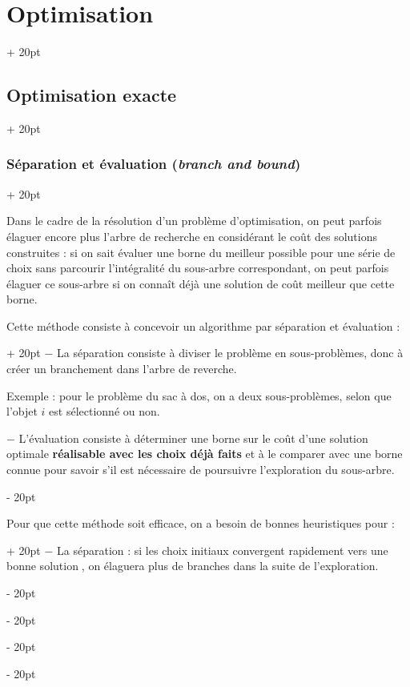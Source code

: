 \documentclass[a4paper, 12pt, twoside]{article}
\newcommand{\simplecit}[1]{\guillemotleft$\;$#1$\;$\guillemotright}
\newcommand{\ind}[1][20pt]{\advance\leftskip + #1}
\newcommand{\deind}[1][20pt]{\advance\leftskip - #1}
\newenvironment{indt}[2][20pt]{#2 \par \ind[#1]}{\par \deind} %
\newcommand{\1}{\mathbbm 1}
\begin{document}
\begin{indt}{\section{Optimisation}}
\begin{indt}{\subsection{Optimisation exacte}}
\begin{indt}{\subsubsection{Séparation et évaluation (\textit{branch and bound})}}
\begin{center}
                \end{center}

                Dans le cadre de la résolution d'un problème d'optimisation, on peut parfois élaguer encore plus l'arbre de recherche en considérant le coût des solutions construites : si on sait évaluer une borne du meilleur possible pour une série de choix sans parcourir l'intégralité du sous-arbre correspondant, on peut parfois élaguer ce sous-arbre si on connaît déjà une solution de coût meilleur que cette borne.

                \begin{indt}{Cette méthode consiste à concevoir un algorithme par séparation et évaluation :}
                    $-$ La séparation consiste à diviser le problème en sous-problèmes, donc à créer un branchement dans l'arbre de reverche.

                    Exemple : pour le problème du sac à dos, on a deux sous-problèmes, selon que l'objet $i$ est sélectionné ou non.

                    \vspace{6pt}
                    
                    $-$ L'évaluation consiste à déterminer une borne sur le coût d'une solution optimale \textbf{réalisable avec les choix déjà faits} et à le comparer avec une borne connue pour savoir s'il est nécessaire de poursuivre l'exploration du sous-arbre.
                \end{indt}

                \vspace{12pt}
                
                \begin{indt}{Pour que cette méthode soit efficace, on a besoin de bonnes heuristiques pour :}
                    $-$ La séparation : si les choix initiaux convergent rapidement vers une \simplecit{bonne solution}, on élaguera plus de branches dans la suite de l'exploration.


\end{indt}
\end{indt}
\end{indt}
\end{indt}
\end{document}
